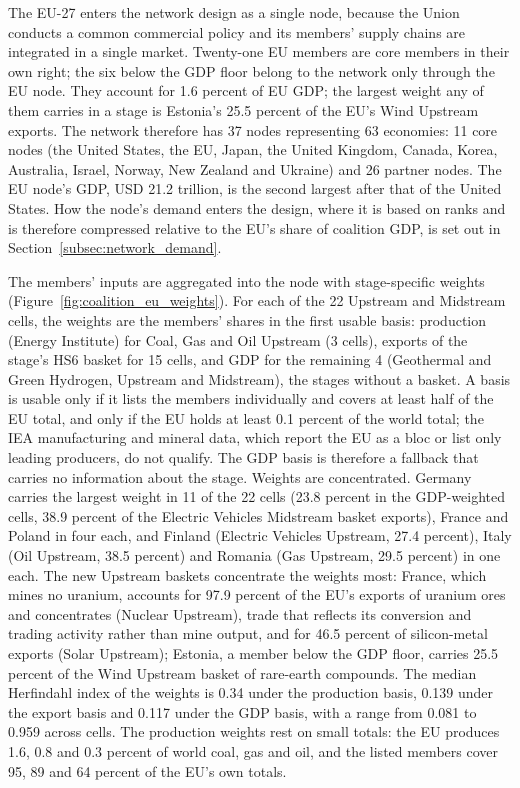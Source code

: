 The EU-27 enters the network design as a single node, because the Union conducts a common
commercial policy and its members' supply chains are integrated in a single market. Twenty-one EU
members are core members in their own right; the six below the GDP floor belong to the network
only through the EU node. They account for 1.6 percent of EU GDP; the largest weight any of them
carries in a stage is Estonia's 25.5 percent of the EU's Wind Upstream exports. The network therefore has 37
nodes representing 63 economies: 11 core nodes (the United States, the EU, Japan, the United
Kingdom, Canada, Korea, Australia, Israel, Norway, New Zealand and Ukraine) and 26 partner nodes.
The EU node's GDP, USD 21.2 trillion, is the second largest after that of the United States.
How the node's demand enters the design, where it is based on ranks and is therefore compressed
relative to the EU's share of coalition GDP, is set out in Section~\ref{subsec:network_demand}.

The members' inputs are aggregated into the node with stage-specific weights
(Figure~\ref{fig:coalition_eu_weights}). For each of the 22 Upstream and Midstream cells, the
weights are the members' shares in the first usable basis: production (Energy Institute) for
Coal, Gas and Oil Upstream (3 cells), exports of the stage's HS6 basket for 15 cells, and GDP for
the remaining 4 (Geothermal and Green Hydrogen, Upstream and Midstream), the stages without a
basket. A basis is usable only if it lists the members individually and covers at least half of
the EU total, and only if the EU holds at least 0.1 percent of the world total; the IEA
manufacturing and mineral data, which report the EU as a bloc or list only leading producers, do
not qualify. The GDP basis is therefore a fallback that carries no information about the stage.
Weights are concentrated. Germany carries the largest weight in 11 of the 22 cells (23.8 percent
in the GDP-weighted cells, 38.9 percent of the Electric Vehicles Midstream basket exports), France
and Poland in four each, and Finland (Electric Vehicles Upstream, 27.4 percent), Italy (Oil
Upstream, 38.5 percent) and Romania (Gas Upstream, 29.5 percent) in one each. The new Upstream
baskets concentrate the weights most: France, which mines no uranium, accounts for 97.9 percent
of the EU's exports of uranium ores and concentrates (Nuclear Upstream), trade that reflects its
conversion and trading activity rather than mine output, and for 46.5 percent of silicon-metal
exports (Solar Upstream);
Estonia, a member below the GDP floor, carries 25.5 percent of the Wind Upstream basket of
rare-earth compounds. The median Herfindahl index of the weights is 0.34 under the production
basis, 0.139 under the export basis and 0.117 under the GDP basis, with a range from 0.081 to
0.959 across cells. The production weights rest on small totals: the EU produces 1.6, 0.8 and 0.3
percent of world coal, gas and oil, and the listed members cover 95, 89 and 64 percent of the
EU's own totals.

